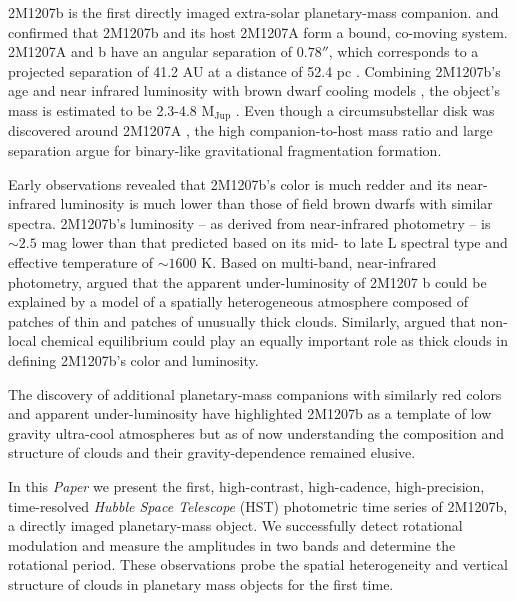 \documentclass[apj]{emulateapj}
\begin{document}
2M1207b \citet{Chauvin2004} is the first directly imaged extra-solar
planetary-mass companion. \citet{Chauvin2005} and \citet{Song2006}
confirmed that 2M1207b and its host 2M1207A form a bound, co-moving
system. 2M1207A and b have an angular separation of $0.78''$, which
corresponds to a projected separation of 41.2 AU at a distance of 52.4
pc \citep[e.g.][]{Ducourant2008}. Combining 2M1207b's age and near
infrared luminosity with brown dwarf cooling models
\citep[e.g.][]{Baraffe2003}, the object's mass is estimated to be
2.3-4.8 M$_{\mathrm{Jup}}$ \citep{Barman2011b}. Even though a
circumsubstellar disk was discovered around 2M1207A
\citep[][]{Sterzik2004}, the high companion-to-host mass ratio and
large separation argue for binary-like gravitational fragmentation
formation\citep{Mohanty2007}.

Early observations revealed that 2M1207b's color is much redder and
its near-infrared luminosity is much lower than those of field brown
dwarfs with similar spectra\citep[e.g][]{Mohanty2007, Skemer2011,
  Barman2011b}. 2M1207b's luminosity -- as derived from near-infrared
photometry -- is $\sim2.5$ mag lower than that predicted based on its
mid- to late L spectral type and effective temperature of $\sim 1600$
 K\citep{Patience2010}.  Based on multi-band, near-infrared photometry,
\citet{Skemer2011} argued that the apparent under-luminosity of 2M1207
b could be explained by a model of a spatially heterogeneous atmosphere
composed of patches of thin and patches of unusually thick clouds.
Similarly, \cite{Barman2011b} argued that non-local chemical
equilibrium could play an equally important role as thick clouds in
defining 2M1207b's color and luminosity.

The discovery of additional planetary-mass companions with similarly
red colors and apparent under-luminosity have highlighted 2M1207b as a
template of low gravity ultra-cool atmospheres but as of now
understanding the composition and structure of clouds and their
gravity-dependence remained elusive.


In this {\em Paper} we present the first, high-contrast, high-cadence,
high-precision, time-resolved {\em Hubble Space Telescope} (HST)
photometric time series of 2M1207b, a directly imaged planetary-mass
object. We successfully detect rotational modulation and measure the
amplitudes in two bands and determine the rotational period. These
observations probe the spatial heterogeneity and vertical structure of
clouds in planetary mass objects for the first time.
\end{document}
